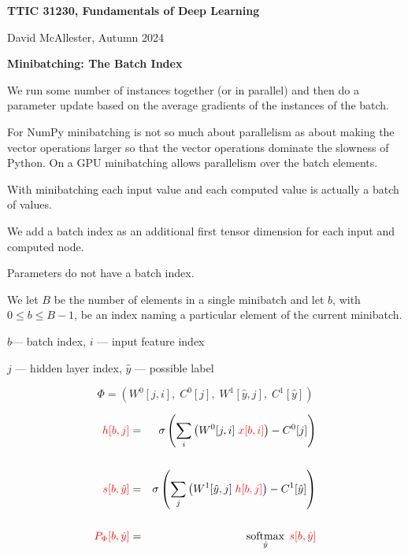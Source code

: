 




{\Huge
  
  \centerline{\bf TTIC 31230, Fundamentals of Deep Learning}
  \bigskip
  \centerline{David McAllester, Autumn 2024}
  \vfill
  \vfill
  \centerline{\bf Minibatching: The Batch Index}
  \vfill
  \vfill

 
We run some number of instances together (or in parallel) and then do a parameter update based on the average
gradients of the instances of the batch.

\vfill
For NumPy minibatching is not so much about parallelism as about making the vector operations larger so that the vector operations dominate
the slowness of Python.  On a GPU minibatching allows parallelism over the batch elements.
\vfill

\vfill
With minibatching each input value and each computed value is actually a batch of values.

\vfill
We add a batch index as an additional first tensor dimension for each input and computed node.

\vfill
Parameters do not have a batch index.


We let $B$ be the number of elements in a single minibatch and let $b$, with $0 \leq b \leq B-1$, be an index naming a particular element of the current minibatch.


\centerline{$b$--- batch index,\hspace{3em} $i$ --- input feature index}
\centerline{$j$ --- hidden layer index, \hspace{3em} $\hat{y}$ --- possible label}
$$\Phi = (W^0[j,i],\;C^0[j],\;W^1[\hat{y},j],\;C^1[\hat{y}])$$

\vfill
\begin{eqnarray*}
  {\color{red} h[b,j]} & = & \sigma\left(\sum_i \left(W^0[j,i] \;{\color{red} x[b,i]}\right) - C^0[j]\right) \\
  \\
  {\color{red} s[b,\hat{y}]} & = & \sigma\left(\sum_j \left(W^1[\hat{y},j]\;{\color{red} h[b,j]}\right) - C^1[\hat{y}]\right) \\
  \\
  {\color{red} P_\Phi[b,\hat{y}]} & = & \operatorname*{softmax}_{\hat{y}}\;{\color{red} s[b,\hat{y}]}
\end{eqnarray*}

}
